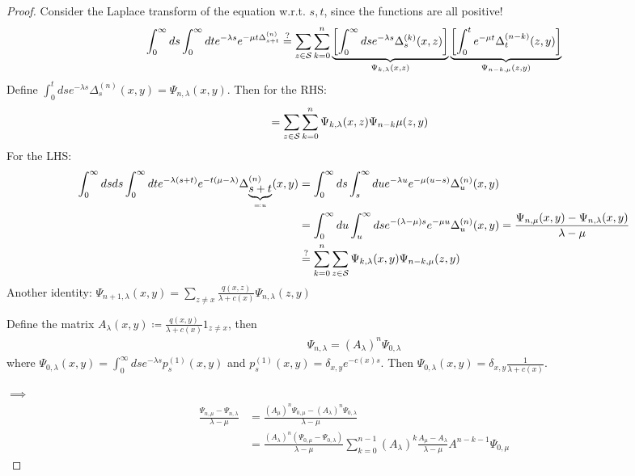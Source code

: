 \begin{proof}
    Consider the Laplace transform of the equation w.r.t. \(s,t\), since the functions are all positive!
    \[\int_0^\infty ds\int_0^\infty dt e^{-\lambda s}e^{-\mu t\Delta_{s+t}^{(n)}}\stackrel{?}{=}\sum_{z\in\mathcal{S}}\sum_{k=0}^n\underbrace{\left[\int_0^\infty ds e^{-\lambda s}\Delta_s^{(k)}(x,z)\right]}_{\Psi_{k,\lambda}(x,z)}\underbrace{\left[\int_0^t e^{-\mu t}\Delta_{t}^{(n-k)}(z,y)\right]}_{\Psi_{n-k,\mu}(z,y)}\]
    Define \(\int_0^t ds e^{-\lambda s}\Delta_s^{(n)}(x,y)=\Psi_{n,\lambda}(x,y)\).
    Then for the RHS:\begin{align*}
        &=\sum_{z\in \mathcal{S}}\sum_{k=0}^n\Psi_{k,\lambda}(x,z)\Psi_{n-k}\mu(z,y)
    \end{align*}
    For the LHS:
    \begin{align*}
       \int_0^\infty ds ds \int_0^\infty dt e^{-\lambda (s+t)}e^{-t(\mu-\lambda)}\Delta_{\underbrace{s+t}_{\eqqcolon u}}^{(n)}(x,y)&=\int_0^\infty ds \int_s^\infty du e^{-\lambda u}e^{-\mu(u-s)}\Delta_{u}^{(n)}(x,y)\\
        &=\int_0^\infty du \int_u^\infty ds e^{-(\lambda-\mu)s}e^{-\mu u}\Delta_{u}^{(n)}(x,y)=\frac{\Psi_{n,\mu}(x,y)-\Psi_{n,\lambda}(x,y)}{\lambda-\mu}\\
        &\stackrel{?}{=}\sum_{k=0}^n\sum_{z\in\mathcal{S}}\Psi_{k,\lambda}(x,y)\Psi_{n-k,\mu}(z,y)
    \end{align*}
    Another identity: \(\Psi_{n+1,\lambda}(x,y)=\sum_{z\neq x}\frac{q(x,z)}{\lambda + c(x)}\Psi_{n,\lambda}(z,y)\)

    Define the matrix \(A_\lambda(x,y)\coloneqq \frac{q(x,y)}{\lambda + c(x)}1_{z\neq x}\), then
    \begin{align*}
        \Psi_{n,\lambda}=(A_\lambda)^n\Psi_{0,\lambda}
    \end{align*}
    where \(\Psi_{0,\lambda}(x,y)=\int_0^\infty ds e^{-\lambda s}p_s^{(1)}(x,y)\) 
    and \(p_s^{(1)}(x,y)=\delta_{x,y}e^{-c(x)s}\).
    Then \( \Psi_{0,\lambda}(x,y)=\delta_{x,y}\frac{1}{\lambda + c(x)}\).

    \(\implies\)
    \begin{align*}
        \frac{\Psi_{n,\mu}-\Psi_{n,\lambda}}{\lambda-\mu} &= \frac{(A_\mu)^n\Psi_{0,\mu}-(A_\lambda)^n \Psi_{0,\lambda}}{\lambda-\mu}\\
        &=\frac{(A_\lambda)^n (\Psi_{0,\mu}-\Psi_{0,\lambda})}{\lambda-\mu}\sum_{k=0}^{n-1} (A_\lambda)^k\frac{A_\mu-A_\lambda}{\lambda-\mu}A^{n-k-1}\Psi_{0,\mu}
    \end{align*}
    

\end{proof}
